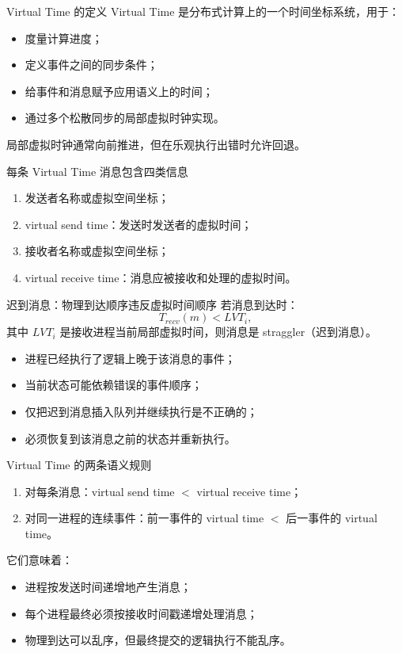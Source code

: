 \documentclass[UTF8,fontset=none,aspectratio=169,10pt]{beamer}
\begin{document}
\begin{frame}{Virtual Time 的定义}
Virtual Time 是分布式计算上的一个时间坐标系统，用于：
\begin{itemize}
  \item 度量计算进度；
  \item 定义事件之间的同步条件；
  \item 给事件和消息赋予应用语义上的时间；
  \item 通过多个松散同步的局部虚拟时钟实现。
\end{itemize}
\vfill
局部虚拟时钟通常向前推进，但在乐观执行出错时允许回退。
\end{frame}

\begin{frame}{每条 Virtual Time 消息包含四类信息}
\begin{enumerate}
  \item 发送者名称或虚拟空间坐标；
  \item virtual send time：发送时发送者的虚拟时间；
  \item 接收者名称或虚拟空间坐标；
  \item virtual receive time：消息应被接收和处理的虚拟时间。
\end{enumerate}
\vfill
{}
\end{frame}

\begin{frame}{迟到消息：物理到达顺序违反虚拟时间顺序}
若消息到达时：
\[
T_{recv}(m)<LVT_i,
\]
其中 $LVT_i$ 是接收进程当前局部虚拟时间，则消息是 straggler（迟到消息）。
\begin{itemize}
  \item 进程已经执行了逻辑上晚于该消息的事件；
  \item 当前状态可能依赖错误的事件顺序；
  \item 仅把迟到消息插入队列并继续执行是不正确的；
  \item 必须恢复到该消息之前的状态并重新执行。
\end{itemize}
\end{frame}

\begin{frame}{Virtual Time 的两条语义规则}
\begin{enumerate}
  \item 对每条消息：virtual send time $<$ virtual receive time；
  \item 对同一进程的连续事件：前一事件的 virtual time $<$ 后一事件的 virtual time。
\end{enumerate}
它们意味着：
\begin{itemize}
  \item 进程按发送时间递增地产生消息；
  \item 每个进程最终必须按接收时间戳递增处理消息；
  \item 物理到达可以乱序，但最终提交的逻辑执行不能乱序。
\end{itemize}
\end{frame}
\end{document}
